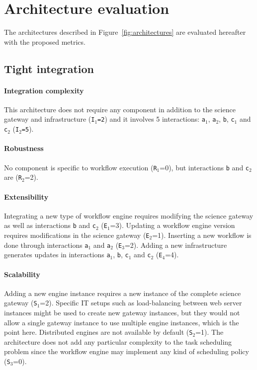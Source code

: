 \documentclass[preprint,3p,twocolumn]{elsarticle}
\newcommand{\correction}[1]{\color{blue}#1\color{black}\xspace}
\begin{document}
\section{\correction{Architecture evaluation}}

\label{sec:evaluation}

The architectures described in Figure~\ref{fig:architectures} are
evaluated \correction{hereafter with the proposed metrics}.

\subsection{Tight integration}

\paragraph{Integration complexity} This architecture does not require any
component in addition to the science gateway and infrastructure
(\texttt{I$_1$=2}) and it involves 5 interactions: \texttt{a$_1$},
\texttt{a$_2$}, \texttt{b}, \texttt{c$_1$} and \texttt{c$_2$}
(\texttt{I$_2$=5}).

\paragraph{Robustness} No component is specific to workflow execution
(\texttt{R$_1$}=0), but interactions \texttt{b} and \texttt{c$_2$} are
(\texttt{R$_2$}=2).

\paragraph{Extensibility} Integrating a new type of workflow engine
requires modifying the science gateway as well as interactions
\texttt{b} and \texttt{c$_2$} (\texttt{E$_1$}=3). Updating a workflow
engine version requires modifications in the science gateway
(\texttt{E$_2$}=1).  Inserting a new workflow is done through
interactions \texttt{a$_1$} and \texttt{a$_2$}
(\texttt{E$_3$}=2). Adding a new infrastructure generates updates in
interactions \texttt{a$_1$}, \texttt{b}, \texttt{c$_1$} and
\texttt{c$_2$} (\texttt{E$_4$}=4).

\paragraph{Scalability} Adding a new engine instance requires a new
instance of the complete science gateway
(\texttt{S$_1$}=2). 
Specific IT setups such as load-balancing between
web server instances might be used to create new gateway instances, but they would not allow a single gateway instance to use multiple engine instances, which is the point here.
Distributed engines are not available by default
(\texttt{S$_2$}=1). 
The architecture does not add any particular complexity to the task scheduling problem since the workflow engine
may implement any kind of scheduling policy (\texttt{S$_3$}=0).
\end{document}
